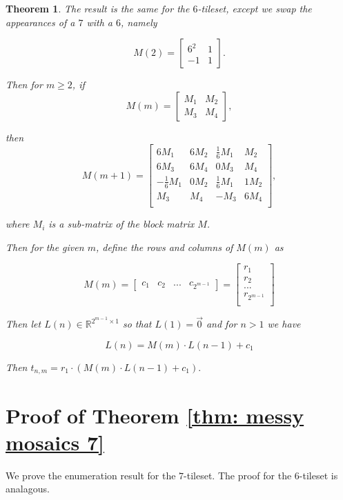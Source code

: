 \documentclass[12pt]{article}
\theoremstyle{plain}
\newtheorem{thm}{Theorem}
\theoremstyle{definition}
\theoremstyle{remark}
\theoremstyle{definition}
\begin{document}
\begin{thm}
\label{thm: messy mosaics 6}
The result is the same for the $6$-tileset, except we swap the appearances of a $7$ with a $6$, namely

$$
M(2) = \begin{bmatrix}
6^2 & 1 \\
-1 & 1
\end{bmatrix}.
$$

Then for $m \geq 2$, if
$$
M(m) = \begin{bmatrix}
M_1 & M_2 \\
M_3 & M_4
\end{bmatrix},
$$

then
$$
M(m+1) = \begin{bmatrix}
6M_1 & 6M_2 & \frac{1}{6}M_1 & M_2 \\
6M_3 & 6M_4 & 0M_3 & M_4 \\
-\frac{1}{6}M_1 & 0M_2 & \frac{1}{6}M_1 & 1M_2 \\
M_3 & M_4 & -M_3 & 6M_4 \\
\end{bmatrix},
$$

where $M_i$ is a sub-matrix of the block matrix $M$.

Then for the given $m$, define the rows and columns of $M(m)$ as

$$
M(m) = 
\begin{bmatrix}
    c_1 & c_2 & ... & c_{2^{m-1}}
\end{bmatrix} = 
\begin{bmatrix}
    r_1 \\
    r_2 \\
    ... \\
    r_{2^{m-1}} \\
\end{bmatrix}
$$

Then let $L(n) \in \mathbb{R}^{2^{m-1} \times 1}$ so that $L(1) = \vec{0}$ and for $n > 1$ we have

$$L(n) = M(m) \cdot L(n-1)+c_1$$

Then $t_{n,m}=r_1 \cdot (M(m) \cdot L(n-1)+c_1).$
\end{thm}

\section{Proof of Theorem \ref{thm: messy mosaics 7}}

We prove the enumeration result for the $7$-tileset. The proof for the $6$-tileset is analagous.
\end{document}
